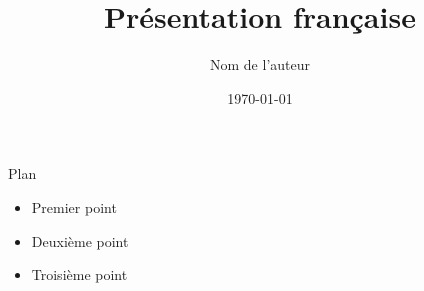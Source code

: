 \documentclass{beamer}
\title{Présentation française}
\author{Nom de l'auteur}
\date{\today}
\begin{document}
\begin{frame}
  \titlepage
\end{frame}

\begin{frame}{Plan}
  \begin{itemize}
    \item Premier point
    \item Deuxième point
    \item Troisième point
  \end{itemize}
\end{frame}
\end{document}
